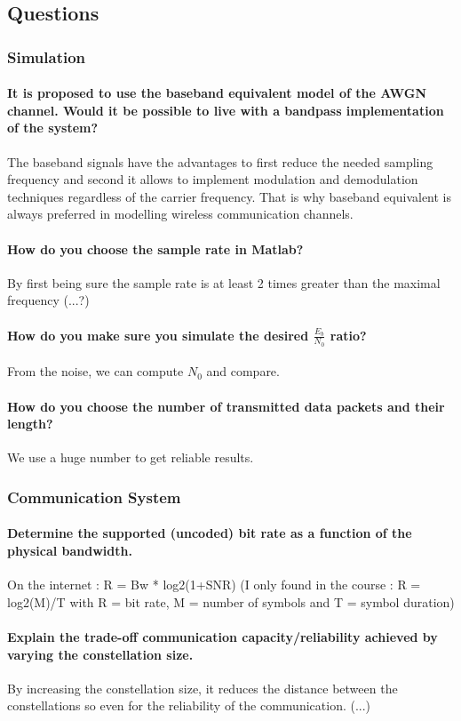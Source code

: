 \subsection{Questions}
\subsubsection{Simulation}
\paragraph{It is proposed to use the baseband equivalent model of the AWGN channel. Would it be
possible to live with a bandpass implementation of the system?}
The baseband signals have the advantages to first reduce the needed sampling frequency and second it allows to implement modulation and demodulation techniques regardless of the carrier frequency. That is why baseband equivalent is always preferred in modelling wireless communication channels.
\paragraph{How do you choose the sample rate in Matlab?} 
By first being sure the sample rate is at least 2 times greater than the maximal frequency (...?)
\paragraph{How do you make sure you simulate the desired $\frac{E_b}{N_0}$ ratio?}
From the noise, we can compute $N_0$ and compare.
\paragraph{How do you choose the number of transmitted data packets and their length?}
We use a huge number to get reliable results.
\subsubsection{Communication System}
\paragraph{Determine the supported (uncoded) bit rate as a function of the physical bandwidth.} On the internet : R = Bw * log2(1+SNR) (I only found in the course : R = log2(M)/T with R = bit rate, M = number of symbols and T = symbol duration)
\paragraph{Explain the trade-off communication capacity/reliability achieved by varying the constellation size.} 
By increasing the constellation size, it reduces the distance between the constellations so even for the reliability of the communication. (...)

